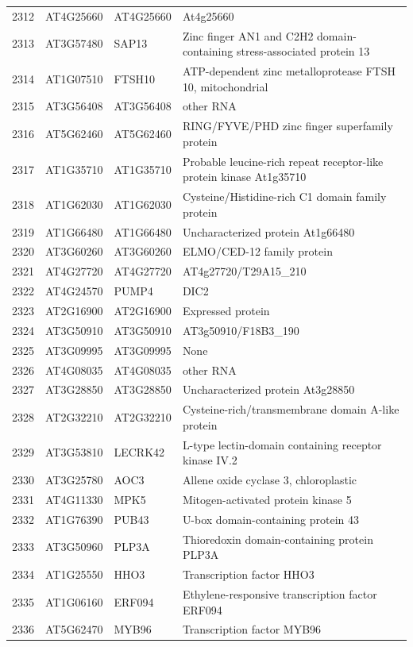 \documentclass[11pt]{article}
\begin{document}
\begin{center}
\begin{tabular}{rlll}
2312 & AT4G25660 & AT4G25660 & At4g25660\\
2313 & AT3G57480 & SAP13 & Zinc finger AN1 and C2H2 domain-containing stress-associated protein 13\\
2314 & AT1G07510 & FTSH10 & ATP-dependent zinc metalloprotease FTSH 10, mitochondrial\\
2315 & AT3G56408 & AT3G56408 & other RNA\\
2316 & AT5G62460 & AT5G62460 & RING/FYVE/PHD zinc finger superfamily protein\\
2317 & AT1G35710 & AT1G35710 & Probable leucine-rich repeat receptor-like protein kinase At1g35710\\
2318 & AT1G62030 & AT1G62030 & Cysteine/Histidine-rich C1 domain family protein\\
2319 & AT1G66480 & AT1G66480 & Uncharacterized protein At1g66480\\
2320 & AT3G60260 & AT3G60260 & ELMO/CED-12 family protein\\
2321 & AT4G27720 & AT4G27720 & AT4g27720/T29A15\_210\\
2322 & AT4G24570 & PUMP4 & DIC2\\
2323 & AT2G16900 & AT2G16900 & Expressed protein\\
2324 & AT3G50910 & AT3G50910 & AT3g50910/F18B3\_190\\
2325 & AT3G09995 & AT3G09995 & None\\
2326 & AT4G08035 & AT4G08035 & other RNA\\
2327 & AT3G28850 & AT3G28850 & Uncharacterized protein At3g28850\\
2328 & AT2G32210 & AT2G32210 & Cysteine-rich/transmembrane domain A-like protein\\
2329 & AT3G53810 & LECRK42 & L-type lectin-domain containing receptor kinase IV.2\\
2330 & AT3G25780 & AOC3 & Allene oxide cyclase 3, chloroplastic\\
2331 & AT4G11330 & MPK5 & Mitogen-activated protein kinase 5\\
2332 & AT1G76390 & PUB43 & U-box domain-containing protein 43\\
2333 & AT3G50960 & PLP3A & Thioredoxin domain-containing protein PLP3A\\
2334 & AT1G25550 & HHO3 & Transcription factor HHO3\\
2335 & AT1G06160 & ERF094 & Ethylene-responsive transcription factor ERF094\\
2336 & AT5G62470 & MYB96 & Transcription factor MYB96\\

\end{tabular}
\end{center}
\end{document}
